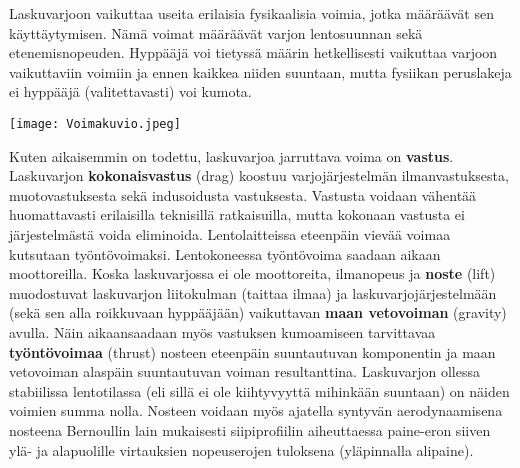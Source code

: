 
Laskuvarjoon vaikuttaa useita erilaisia fysikaalisia voimia, jotka määräävät sen käyttäytymisen. Nämä voimat määräävät varjon lentosuunnan sekä etenemisnopeuden. Hyppääjä voi tietyssä määrin hetkellisesti vaikuttaa varjoon vaikuttaviin voimiin ja ennen kaikkea niiden suuntaan, mutta fysiikan peruslakeja ei hyppääjä (valitettavasti) voi kumota.  


\begin{Figure}\centering\texttt{[image: Voimakuvio.jpeg]}\end{Figure} 


Kuten aikaisemmin on todettu, laskuvarjoa jarruttava voima on \textbf{vastus}. Laskuvarjon \textbf{kokonaisvastus} (drag) koostuu varjojärjestelmän ilmanvastuksesta, muotovastuksesta sekä indusoidusta vastuksesta. Vastusta voidaan vähentää huomattavasti erilaisilla teknisillä ratkaisuilla, mutta kokonaan vastusta ei järjestelmästä voida eliminoida. Lentolaitteissa eteenpäin vievää voimaa kutsutaan työntövoimaksi. Lentokoneessa työntövoima saadaan aikaan moottoreilla. Koska laskuvarjossa ei ole moottoreita, ilmanopeus ja \textbf{noste} (lift) muodostuvat laskuvarjon liitokulman (taittaa ilmaa) ja laskuvarjojärjestelmään (sekä sen alla roikkuvaan hyppääjään) vaikuttavan \textbf{maan vetovoiman} (gravity) avulla. Näin aikaansaadaan myös vastuksen kumoamiseen tarvittavaa \textbf{työntövoimaa} (thrust) nosteen eteenpäin suuntautuvan komponentin ja maan vetovoiman alaspäin suuntautuvan voiman resultanttina. Laskuvarjon ollessa stabiilissa lentotilassa (eli sillä ei ole kiihtyvyyttä mihinkään suuntaan) on näiden voimien summa nolla. Nosteen voidaan myös ajatella syntyvän aerodynaamisena nosteena Bernoullin lain mukaisesti siipiprofiilin aiheuttaessa paine-eron siiven ylä- ja alapuolille virtauksien nopeuserojen tuloksena (yläpinnalla alipaine). 


